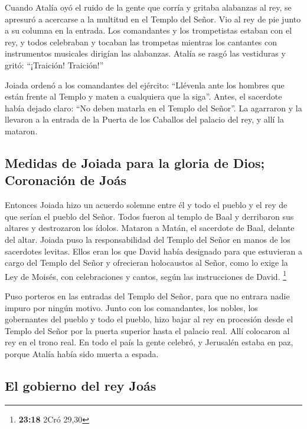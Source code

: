  Cuando Atalía oyó el ruido de la gente que corría y
gritaba alabanzas al rey, se apresuró a acercarse a la multitud en el
Templo del Señor.  Vio al rey de pie junto a su columna
en la entrada. Los comandantes y los trompetistas estaban con el rey, y
todos celebraban y tocaban las trompetas mientras los cantantes con
instrumentos musicales dirigían las alabanzas. Atalía se rasgó las
vestiduras y gritó: ``¡Traición! Traición!''

 Joiada ordenó a los comandantes del ejército: ``Llévenla
ante los hombres que están frente al Templo y maten a cualquiera que la
siga''. Antes, el sacerdote había dejado claro: ``No deben matarla en el
Templo del Señor''.  La agarraron y la llevaron a la
entrada de la Puerta de los Caballos del palacio del rey, y allí la
mataron.

\hypertarget{medidas-de-joiada-para-la-gloria-de-dios-coronaciuxf3n-de-jouxe1s}{%
\subsection{Medidas de Joiada para la gloria de Dios; Coronación de
Joás}\label{medidas-de-joiada-para-la-gloria-de-dios-coronaciuxf3n-de-jouxe1s}}

 Entonces Joiada hizo un acuerdo solemne entre él y todo
el pueblo y el rey de que serían el pueblo del Señor. 
Todos fueron al templo de Baal y derribaron sus altares y destrozaron
los ídolos. Mataron a Matán, el sacerdote de Baal, delante del altar.
 Joiada puso la responsabilidad del Templo del Señor en
manos de los sacerdotes levitas. Ellos eran los que David había
designado para que estuvieran a cargo del Templo del Señor y ofrecieran
holocaustos al Señor, como lo exige la Ley de Moisés, con celebraciones
y cantos, según las instrucciones de David. \footnote{\textbf{23:18}
  2Cró 29,30}

 Puso porteros en las entradas del Templo del Señor, para
que no entrara nadie impuro por ningún motivo.  Junto con
los comandantes, los nobles, los gobernantes del pueblo y todo el
pueblo, hizo bajar al rey en procesión desde el Templo del Señor por la
puerta superior hasta el palacio real. Allí colocaron al rey en el trono
real.  En todo el país la gente celebró, y Jerusalén
estaba en paz, porque Atalía había sido muerta a espada.

\hypertarget{el-gobierno-del-rey-jouxe1s}{%
\subsection{El gobierno del rey
Joás}\label{el-gobierno-del-rey-jouxe1s}}

